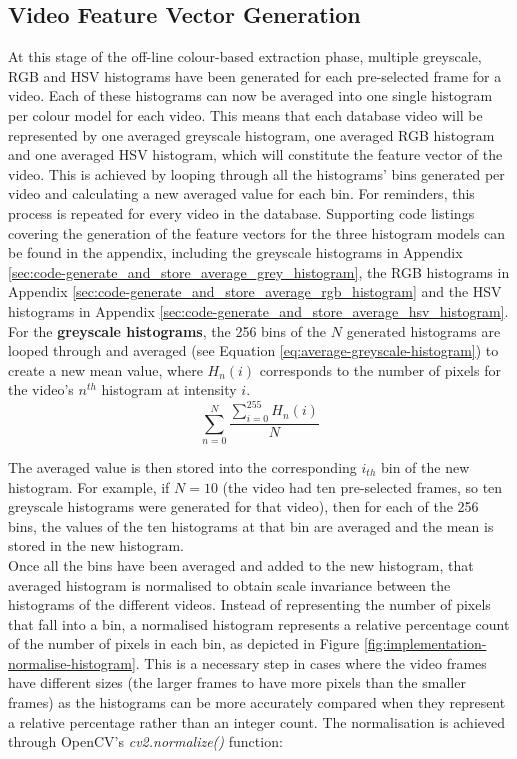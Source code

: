 
\subsection{Video Feature Vector Generation}
\label{sec:implementation-compact-video-signature}

At this stage of the off-line colour-based extraction phase, multiple greyscale, RGB and HSV histograms have been generated for each pre-selected frame for a video. Each of these histograms can now be averaged into one single histogram per colour model for each video. This means that each database video will be represented by one averaged greyscale histogram, one averaged RGB histogram and one averaged HSV histogram, which will constitute the feature vector of the video. This is achieved by looping through all the histograms' bins generated per video and calculating a new averaged value for each bin. For reminders, this process is repeated for every video in the database. Supporting code listings covering the generation of the feature vectors for the three histogram models can be found in the appendix, including the greyscale histograms in Appendix \ref{sec:code-generate_and_store_average_grey_histogram}, the RGB histograms in Appendix \ref{sec:code-generate_and_store_average_rgb_histogram} and the HSV histograms in Appendix \ref{sec:code-generate_and_store_average_hsv_histogram}.\\

For the \textbf{greyscale histograms}, the 256 bins of the $N$ generated histograms are looped through and averaged (see Equation \ref{eq:average-greyscale-histogram}) to create a new mean value, where $H_n(i)$ corresponds to the number of pixels for the video's $n^{th}$ histogram at intensity $i$.
\begin{equation}
\label{eq:average-greyscale-histogram}
    \sum_{n=0}^{N} \frac{\sum_{i=0}^{255} H_n(i)}{N}
\end{equation}

The averaged value is then stored into the corresponding $i_{th}$ bin of the new histogram. For example, if $N=10$ (the video had ten pre-selected frames, so ten greyscale histograms were generated for that video), then for each of the 256 bins, the values of the ten histograms at that bin are averaged and the mean is stored in the new histogram.\\

Once all the bins have been averaged and added to the new histogram, that averaged histogram is normalised to obtain scale invariance between the histograms of the different videos. Instead of representing the number of pixels that fall into a bin, a normalised histogram represents a relative percentage count of the number of pixels in each bin, as depicted in Figure \ref{fig:implementation-normalise-histogram}. This is a necessary step in cases where the video frames have different sizes (the larger frames to have more pixels than the smaller frames) as the histograms can be more accurately compared when they represent a relative percentage rather than an integer count. The normalisation is achieved through OpenCV's \textit{cv2.normalize()} function:

